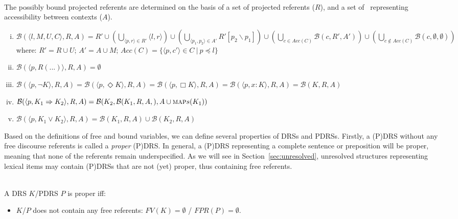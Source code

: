 \begin{subdefinition}~\\
  The possibly bound projected referents are determined on the basis of a
  set of projected referents ($R$), and a set of \MAPs~representing
  accessibility between contexts ($A$).
  \begin{enumerate}[i.]
    \item $\mathcal{B}(\langle l, M, U, C \rangle,R,A) 
      = R' \cup (\bigcup_{\langle p, r\rangle\in R'} \langle l, r\rangle)
      \cup (\bigcup_{\langle p_1,p_2\rangle\in A'} R'[p_2\backslash p_1])
      \cup (\bigcup_{c\in Acc(C)} \mathcal{B}(c,R',A'))
      \cup (\bigcup_{c\notin Acc(C)} \mathcal{B}(c,\emptyset,\emptyset))$\\
      where: $R' = R \cup U$;
             $A' = A \cup M$;
             $Acc(C) = \{\langle p, c'\rangle \in C~|~ p \preceq l\}$
    \item $\mathcal{B}(\langle p, R(...)\rangle,R,A) = \emptyset$
    \item $\mathcal{B}(\langle p,\neg K\rangle,R,A)
      = \mathcal{B}(\langle p,\Diamond K\rangle,R,A)
      = \mathcal{B}(\langle p,\Box K\rangle,R,A)
      = \mathcal{B}(\langle p,x:K\rangle,R,A)
      = \mathcal{B}(K,R,A)$
    \item $\mathcal{B}(\langle p,K_1 \Rightarrow K_2\rangle,R,A)
      = \mathcal{B}(K_2,\mathcal{B}(K_1,R,A,),A\cup \textsc{map}s(K_1))$
    \item $\mathcal{B}(\langle p,K_1 \vee K_2\rangle,R,A)
      = \mathcal{B}(K_1,R,A) \cup \mathcal{B}(K_2,R,A)$
      \end{enumerate}
\end{subdefinition}

Based on the definitions of free and bound variables, we can define several
properties of DRSs and PDRSs. Firstly, a (P)DRS without any free discourse
referents is called a \textit{proper} (P)DRS. In general, a (P)DRS
representing a complete sentence or preposition will be proper, meaning that
none of the referents remain underspecified. As we will see in
Section~\ref{sec:unresolved}, unresolved structures representing lexical
items may contain (P)DRSs that are not (yet) proper, thus containing free
referents.

\begin{definition}[Properness]~\\
A DRS $K$/PDRS $P$ is proper iff:
\begin{itemize}
  \item $K$/$P$ does not contain any free referents: $FV(K) = \emptyset$ / $FPR(P) = \emptyset$.
\end{itemize}
\end{definition}

